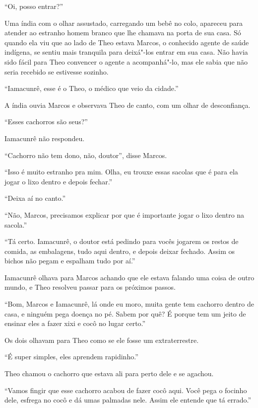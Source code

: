 \asterisc


``Oi, posso entrar?''

Uma índia com o olhar assustado, carregando um bebê no colo, apareceu
para atender ao estranho homem branco que lhe chamava na porta de sua
casa. Só quando ela viu que ao lado de Theo estava Marcos, o conhecido agente de saúde indígena,
se sentiu mais tranquila para deixá"-los entrar em sua
casa. Não havia sido fácil para Theo convencer o agente a acompanhá"-lo,
mas ele sabia que não seria recebido se estivesse sozinho.

``Iamacunrê, esse é o Theo, o médico que veio da cidade.''

A índia ouvia Marcos e observava Theo de canto, com um olhar de
desconfiança.

``Esses cachorros são seus?''

Iamacunrê não respondeu.

``Cachorro não tem dono, não, doutor'', disse Marcos.

``Isso é muito estranho pra mim. Olha, eu trouxe essas sacolas que é
para ela jogar o lixo dentro e depois fechar.''

``Deixa aí no canto.''

``Não, Marcos, precisamos explicar por que é importante jogar o lixo
dentro na sacola.''

``Tá certo. Iamacunrê, o doutor está pedindo para vocês jogarem os
restos de comida, as embalagens, tudo aqui dentro, e depois deixar
fechado. Assim os bichos não pegam e espalham tudo por aí.''

Iamacunrê olhava para Marcos achando que ele estava falando uma coisa de
outro mundo, e Theo resolveu passar para os próximos passos.

``Bom, Marcos e Iamacunrê, lá onde eu moro, muita gente tem cachorro
dentro de casa, e ninguém pega doença no pé. Sabem por quê? É porque tem
um jeito de ensinar eles a fazer xixi e cocô no lugar certo.''

Os dois olhavam para Theo como se ele fosse um extraterrestre.

``É super simples, eles aprendem rapidinho.''

Theo chamou o cachorro que estava ali para perto dele e se agachou.

``Vamos fingir que esse cachorro acabou de fazer cocô aqui. Você pega o
focinho dele, esfrega no cocô e dá umas palmadas nele. Assim ele entende
que tá errado.''

